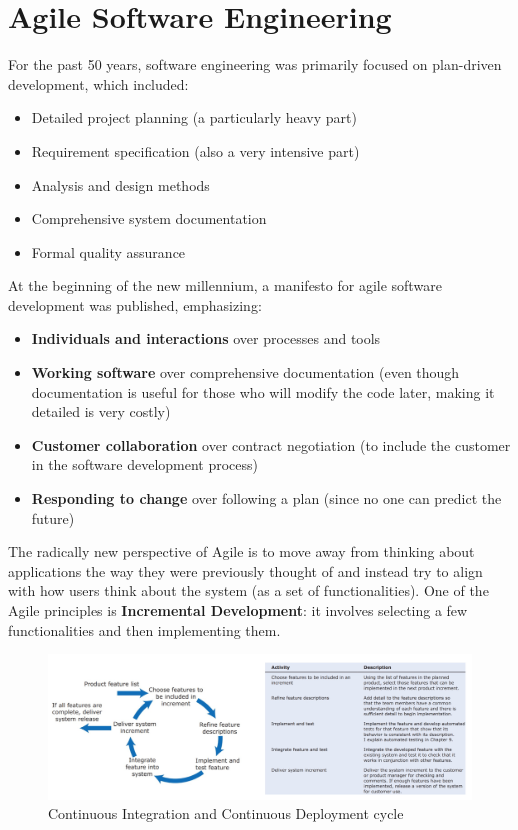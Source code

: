 \chapter{Agile Software Engineering}
For the past 50 years, software engineering was primarily focused on plan-driven development, which included:

\begin{itemize}
    \item Detailed project planning (a particularly heavy part)
    \item Requirement specification (also a very intensive part)
    \item Analysis and design methods
    \item Comprehensive system documentation
    \item Formal quality assurance
\end{itemize}

\noindent At the beginning of the new millennium, a manifesto for agile software development was published, emphasizing:

\begin{itemize}
    \item \textbf{Individuals and interactions} over processes and tools
    \item \textbf{Working software} over comprehensive documentation (even though documentation is useful for those who will modify the code later, making it detailed is very costly)
    \item \textbf{Customer collaboration} over contract negotiation (to include the customer in the software development process)
    \item \textbf{Responding to change} over following a plan (since no one can predict the future)
\end{itemize}

The radically new perspective of Agile is to move away from thinking about applications the way they were previously thought of and instead try to align with how users think about the system (as a set of functionalities). One of the Agile principles is \textbf{Incremental Development}: it involves selecting a few functionalities and then implementing them.

\begin{figure} [H]
    \centering
    \includegraphics[width=1\textwidth]{images/Agile/CICD.png}
    \caption{Continuous Integration and Continuous Deployment cycle}
    \label{fig:CICD}
\end{figure}


